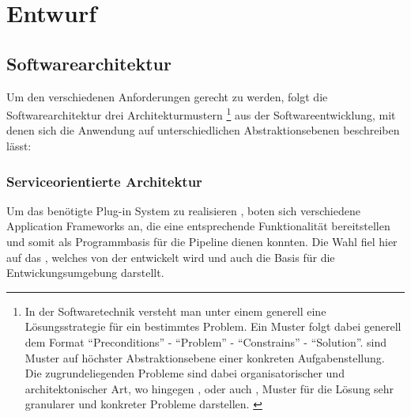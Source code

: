 \chapter{Entwurf}

\section{Softwarearchitektur}\label{chp:softwarearchitektur}
Um den verschiedenen Anforderungen gerecht zu werden,
folgt die Softwarearchitektur drei Architekturmustern
\footnote{
In der Softwaretechnik versteht man unter einem  generell eine
Lösungsstrategie für ein bestimmtes Problem.
Ein Muster folgt dabei generell dem Format \enquote{Preconditions} -
\enquote{Problem} - \enquote{Constrains} - \enquote{Solution}.
\citep{beck_patterns_1994}
 sind Muster auf höchster Abstraktionsebene
einer konkreten Aufgabenstellung.
Die zugrundeliegenden Probleme sind dabei organisatorischer und
architektonischer Art, wo hingegen , oder
auch , Muster für die Lösung sehr granularer und konkreter
Probleme darstellen.
\citep{buschmann_pattern-oriented_1996}
}
aus der
Softwareentwicklung, mit denen sich die Anwendung auf unterschiedlichen
Abstraktionsebenen beschreiben lässt:




\subsection{Serviceorientierte Architektur}

Um das benötigte Plug-in System zu realisieren , boten
sich verschiedene Application Frameworks an, die eine entsprechende Funktionalität
bereitstellen und somit als Programmbasis für die  Pipeline dienen konnten.
Die Wahl fiel hier auf das  , welches von
der  entwickelt wird und auch die Basis für die
Entwickungsumgebung  darstellt.






 
